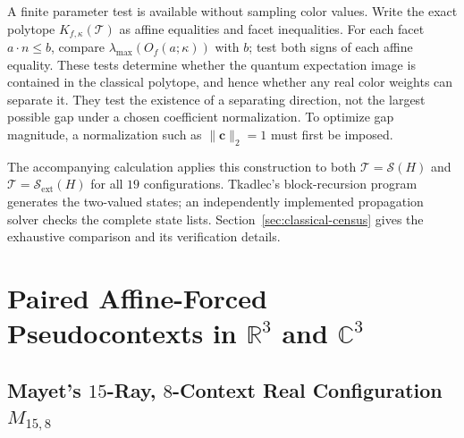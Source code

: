 \documentclass[aps,pra,reprint,superscriptaddress,longbibliography,nofootinbib,floatfix,10pt]{revtex4-2}
\theoremstyle{definition}\newtheorem{definition}[theorem]{Definition}
\theoremstyle{remark}\newtheorem{remark}[theorem]{Remark}
\newcommand{\C}{\mathbb C}\newcommand{\R}{\mathbb R}\newcommand{\Q}{\mathbb Q}
\newcommand{\Sc}{\mathcal S}\newcommand{\Cc}{\mathcal C}\newcommand{\Wc}{\mathcal W}
\begin{document}
A finite parameter test is available without sampling color values. Write the exact polytope $K_{f,\kappa}(\mathcal T)$ as affine equalities and facet inequalities. For each facet $a\cdot n\le b$, compare $\lambda_{\max}(O_f(a;\kappa))$ with $b$; test both signs of each affine equality. These tests determine whether the quantum expectation image is contained in the classical polytope, and hence whether any real color weights can separate it. They test the existence of a separating direction, not the largest possible gap under a chosen coefficient normalization. To optimize gap magnitude, a normalization such as $\|\mathbf c\|_2=1$ must first be imposed.

The accompanying calculation applies this construction to both $\mathcal T=\Sc(H)$ and $\mathcal T=\Sc_{\mathrm{ext}}(H)$ for all $19$ configurations. Tkadlec's block-recursion program~\cite{tkadlec-2states} generates the two-valued states; an independently implemented propagation solver checks the complete state lists. Section~\ref{sec:classical-census} gives the exhaustive comparison and its verification details.

\section{Paired Affine-Forced Pseudocontexts in \texorpdfstring{$\R^3$ and $\C^3$}{R3 and C3}}\label{sec:paired-affine}

\subsection{Mayet's \texorpdfstring{$15$}{15}-Ray, \texorpdfstring{$8$}{8}-Context Real Configuration \texorpdfstring{$M_{15,8}$}{M15,8}}\label{sec:mayet}
\end{document}
